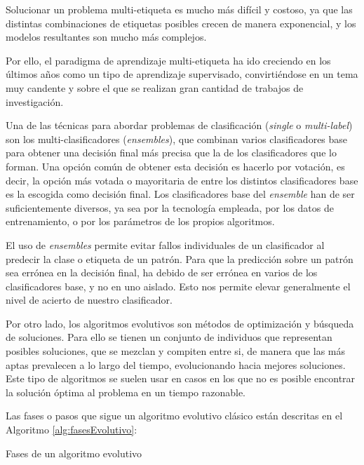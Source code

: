 Solucionar un problema multi-etiqueta es mucho más difícil y costoso, ya que las distintas combinaciones de etiquetas posibles crecen de manera exponencial, y los modelos resultantes son mucho más complejos.

Por ello, el paradigma de aprendizaje multi-etiqueta ha ido creciendo en los últimos años como un tipo de aprendizaje supervisado, convirtiéndose en un tema muy candente y sobre el que se realizan gran cantidad de trabajos de investigación.

Una de las técnicas para abordar problemas de clasificación (\textit{single} o \textit{multi-label}) son los multi-clasificadores (\textit{ensembles}), que combinan varios clasificadores base para obtener una decisión final más precisa que la de los clasificadores que lo forman. Una opción común de obtener esta decisión es hacerlo por votación, es decir, la opción más votada o mayoritaria de entre los distintos clasificadores base es la escogida como decisión final. Los clasificadores base del \textit{ensemble} han de ser suficientemente diversos, ya sea por la tecnología empleada, por los datos de entrenamiento, o por los parámetros de los propios algoritmos.

El uso de \textit{ensembles} permite evitar fallos individuales de un clasificador al predecir la clase o etiqueta de un patrón. Para que la predicción sobre un patrón sea errónea en la decisión final, ha debido de ser errónea en varios de los clasificadores base, y no en uno aislado. Esto nos permite elevar generalmente el nivel de acierto de nuestro clasificador.

Por otro lado, los algoritmos evolutivos son métodos de optimización y búsqueda de soluciones. Para ello se tienen un conjunto de individuos que representan posibles soluciones, que se mezclan y compiten entre si, de manera que las más aptas prevalecen a lo largo del tiempo, evolucionando hacia mejores soluciones. Este tipo de algoritmos se suelen usar en casos en los que no es posible encontrar la solución óptima al problema en un tiempo razonable.

Las fases o pasos que sigue un algoritmo evolutivo clásico están descritas en el Algoritmo \ref{alg:fasesEvolutivo}:

\begin{algorithm}[H]
\begin{algorithmic}[1]
\ENDFOR
\end{algorithmic}
\caption{Fases de un algoritmo evolutivo}
\label{alg:fasesEvolutivo}
\end{algorithm}

